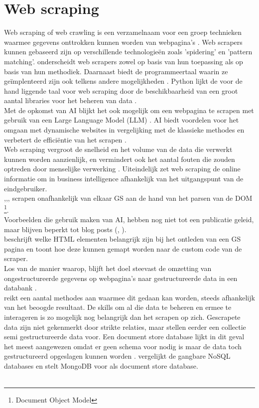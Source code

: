 \section{Web scraping}
Web scraping of web crawling is een verzamelnaam voor een groep technieken waarmee gegevens onttrokken kunnen worden van webpagina's \autocite{Bhatt2023}. Web scrapers kunnen gebaseerd zijn op verschillende technologieën zoals 'spidering' en 'pattern matching'. \textcite{Lotfi2021} onderscheidt web scrapers zowel op basis van hun toepassing als op basis van hun  methodiek. Daarnaast biedt de programmeertaal waarin ze geïmplenteerd zijn ook telkens andere mogelijkheden \autocite{Bhatt2023}.
Python lijkt de voor de hand liggende taal voor web scraping door de beschikbaarheid van een groot aantal libraries voor het beheren van data \autocite{Kumar2023}.\\
Met de opkomst van AI blijkt het ook mogelijk om een webpagina te scrapen met gebruik van een Large Language Model (LLM) \autocite{Ahluwalia2024}. AI biedt voordelen voor het omgaan met dynamische websites in vergelijking met de klassieke methodes en verbetert de efficiëntie van het scrapen \autocite{Ayuso2024}.\\
Web scraping vergroot de snelheid en het volume van de data die verwerkt kunnen worden aanzienlijk, en vermindert ook het aantal fouten die zouden optreden door menselijke verwerking \autocite{Bhatt2023}. Uiteindelijk zet web scraping de online informatie om in business intelligence afhankelijk van het uitgangspunt van de eindgebruiker.\\
\textcite{Pratiba2018},\textcite{Rafsanjani2022},\textcite{Amin2024},\textcite{Sulistya2024} scrapen onafhankelijk van elkaar GS aan de hand van het parsen van de DOM \footnote{Document Object Model}.\\
Voorbeelden die gebruik maken van AI, hebben nog niet tot een publicatie geleid, maar blijven beperkt tot blog posts (\autocite{Serpapiai2025}, \autocite{Anthropic2025}).\\
\textcite{Yang2017} beschrijft welke HTML elementen belangrijk zijn bij het ontleden van een GS pagina en \textcite{Rahmatulloh2020} toont hoe deze kunnen gemapt worden naar de custom code van de scraper.\\
Los van de manier waarop, blijft het doel steevast de omzetting van ongestructureerde gegevens op webpagina's naar gestructureerde data in een databank \autocite{Singrodia2019}.\\
\textcite{Mitchell2015} reikt een aantal methodes aan waarmee dit gedaan kan worden, steeds afhankelijk van het beoogde resultaat. De skills om al die data te beheren en ermee te interageren is zo mogelijk nog belangrijk dan het scrapen op zich. Gescrapete data zijn niet gekenmerkt door strikte relaties, maar stellen eerder een collectie semi gestructureerde data voor. Een document store database lijkt in dit geval het meest aangewezen omdat er geen schema voor nodig is maar de data toch gestructureerd opgeslagen kunnen worden \autocite{Meier2019}. \textcite{Lourenco2015} vergelijkt de gangbare NoSQL databases en stelt MongoDB voor als document store database.\\\\
